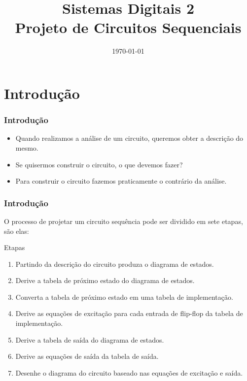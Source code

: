 \documentclass{beamer}
\title{Sistemas Digitais 2\\ \textbf{Projeto de Circuitos Sequenciais}}
\date{\today}
\institute{\textbf{Universidade de Brasília - Faculdade do Gama}}
\begin{document}
\begin{frame}
  \titlepage
\end{frame}
  
\section{Introdução}
\begin{frame}
  \frametitle{Introdução}
  \begin{itemize}
   \item Quando realizamos a análise de um circuito, queremos obter a descrição do mesmo. \pause
   \item Se quisermos construir o circuito, o que devemos fazer? \pause
   \item Para construir o circuito fazemos praticamente o contrário da análise.
  \end{itemize}
\end{frame}

\begin{frame}
 \frametitle{Introdução}
 O processo de projetar um circuito sequência pode ser dividido em sete etapas, são elas:
 \begin{block}{Etapas}
  \begin{enumerate}
   \item Partindo da descrição do circuito produza o diagrama de estados.\pause
   \item Derive a tabela de próximo estado do diagrama de estados.\pause
   \item Converta a tabela de próximo estado em uma tabela de implementação.\pause
   \item Derive as equações de excitação para cada entrada de flip-flop da tabela de implementação.\pause
   \item Derive a tabela de saída do diagrama de estados.\pause
   \item Derive as equações de saída da tabela de saída. \pause
   \item Desenhe o diagrama do circuito baseado nas equações de excitação e saída.
  \end{enumerate}

 \end{block}

\end{frame}


\end{document}
